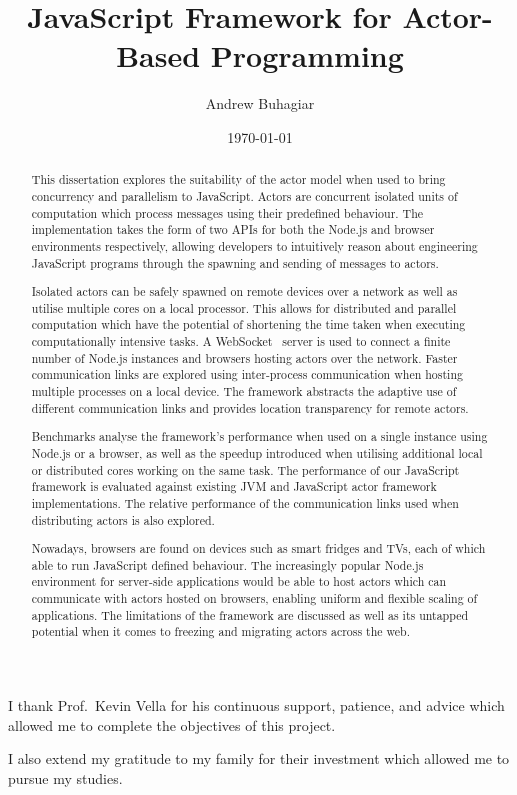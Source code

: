 \documentclass[12pt, a4paper]{report}
\theoremstyle{definition}
\theoremstyle{definition}%
\theoremstyle{definition}%
\theoremstyle{definition}%
\theoremstyle{definition}%
\theoremstyle{definition}%
\begin{document}
\title{JavaScript Framework for Actor-Based Programming}
\author{Andrew Buhagiar}
\date{\today}

\frontmatter

\begin{acknowledgements}
I thank Prof.\ Kevin Vella for his continuous support, patience, and advice which allowed me to complete the objectives of this project.

I also extend my gratitude to my family for their investment which allowed me to pursue my studies.

\end{acknowledgements}
       
\begin{abstract}
This dissertation explores the suitability of the actor model when used to bring concurrency and parallelism to JavaScript. Actors are concurrent isolated units of computation which process messages using their predefined behaviour. The implementation takes the form of two APIs for both the Node.js and browser environments respectively, allowing developers to intuitively reason about engineering JavaScript programs through the spawning and sending of messages to actors.

Isolated actors can be safely spawned on remote devices over a network as well as utilise multiple cores on a local processor. This allows for distributed and parallel computation which have the potential of shortening the time taken when executing computationally intensive tasks. A WebSocket~\cite{websocket} server is used to connect a finite number of Node.js instances and browsers hosting actors over the network. Faster communication links are explored using inter-process communication when hosting multiple processes on a local device. The framework abstracts the adaptive use of different communication links and provides location transparency for remote actors.

Benchmarks analyse the framework's performance when used on a single instance using Node.js or a browser, as well as the speedup introduced when utilising additional local or distributed cores working on the same task. The performance of our JavaScript framework is evaluated against existing JVM and JavaScript actor framework implementations. The relative performance of the communication links used when distributing actors is also explored.

Nowadays, browsers are found on devices such as smart fridges and TVs, each of which able to run JavaScript defined behaviour. The increasingly popular Node.js environment for server-side applications would be able to host actors which can communicate with actors hosted on browsers, enabling uniform and flexible scaling of applications. The limitations of the framework are discussed as well as its untapped potential when it comes to freezing and migrating actors across the web.
\end{abstract}
\end{document}
